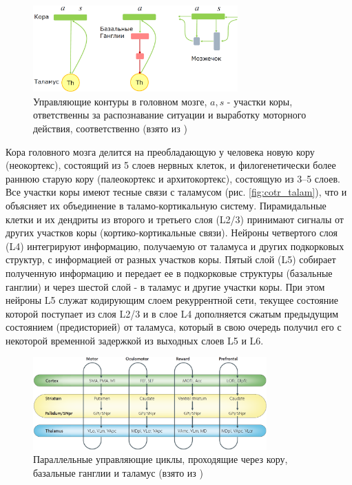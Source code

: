 \documentclass[12pt]{report}
\begin{document}
	\begin{figure}
		\centering
		\includegraphics[width=0.7\textwidth]{misc/phisio/shumsky_loops}
		\caption{Управляющие контуры в головном мозге, $a,s$ - участки коры, ответственны за распознавание ситуации и выработку моторного действия, соответственно (взято из \cite{Shumsky2015b})}
		\label{fig:control_loops}		
	\end{figure}

	Кора головного мозга делится на преобладающую у человека новую кору (неокортекс), состоящий из 5 слоев нервных клеток, и филогенетически более раннюю старую кору (палеокортекс и архитокортекс), состоящую из 3--5 слоев. Все участки коры имеют тесные связи с таламусом \cite{Izhikevich2008} (рис. \ref{fig:cotr_talam}), что и объясняет их объединение в таламо-кортикальную систему. Пирамидальные клетки и их дендриты из второго и третьего слоя (L2/3) принимают сигналы от других участков коры (кортико-кортикальные связи). Нейроны четвертого слоя (L4) интегрируют информацию, получаемую от таламуса и других подкорковых структур, с информацией от разных участков коры. Пятый слой (L5) собирает полученную информацию и передает ее в подкорковые структуры (базальные ганглии) и через шестой слой - в таламус и другие участки коры. При этом нейроны L5 служат кодирующим слоем рекуррентной сети, текущее состояние которой поступает из слоя L2/3 и в слое L4 дополняется сжатым предыдущим состоянием (предисторией) от таламуса, который в свою очередь получил его с некоторой временной задержкой из выходных слоев L5 и L6.
	
	\begin{figure}
		\centering
		\includegraphics[width=0.8\textwidth]{misc/phisio/control_loops}
		\caption{Параллельные управляющие циклы, проходящие через кору, базальные ганглии и таламус (взято из \cite{Kringelbach2007})}
		\label{fig:control}		
	\end{figure}
\end{document}
